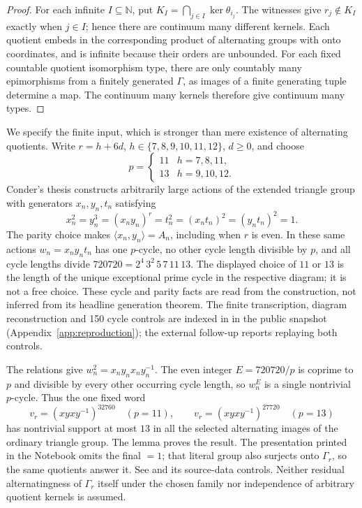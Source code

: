 \begin{proof}
For each infinite \(I\subseteq\mathbb N\), put
\(K_I=\bigcap_{j\in I}\ker\theta_{i_j}\).
The witnesses give \(r_j\notin K_I\) exactly when \(j\in I\);
hence there are continuum many different kernels.
Each quotient embeds in the corresponding product of alternating
groups with onto coordinates, and is infinite because their orders
are unbounded. For each fixed countable quotient isomorphism type,
there are only countably many epimorphisms from a finitely generated
\(\Gamma\), as images of a finite generating tuple determine a map.
The continuum many kernels therefore give continuum many types.
\end{proof}

We specify the finite input, which is stronger than mere existence
of alternating quotients.
Write \(r=h+6d\), \(h\in\{7,8,9,10,11,12\}\), \(d\ge0\), and choose
\[
 p=\begin{cases}11&h=7,8,11,\\13&h=9,10,12.\end{cases}
\]
Conder's thesis \cite[Chapter~5, pp.~117--120]{conder-thesis}
constructs arbitrarily large actions of the extended triangle group
with generators \(x_n,y_n,t_n\) satisfying
\[
 x_n^2=y_n^3=(x_ny_n)^r=t_n^2=(x_nt_n)^2=(y_nt_n)^2=1.
\]
The parity choice makes \(\langle x_n,y_n\rangle=A_n\), including
when \(r\) is even. In these same actions \(w_n=x_ny_nt_n\) has
one \(p\)-cycle, no other cycle length divisible by \(p\), and all
cycle lengths divide \(720720=2^4\,3^2\,5\,7\,11\,13\).
The displayed choice of \(11\) or \(13\) is the length of the unique
exceptional prime cycle in the respective diagram; it is not a free
choice. These cycle and parity facts are read from the construction,
not inferred from its headline generation theorem.
The finite transcription, diagram reconstruction and 150 cycle controls
are indexed in  in the public
snapshot (Appendix~\ref{app:reproduction}); the external follow-up
reports replaying both controls.

The relations give \(w_n^2=x_ny_nx_ny_n^{-1}\).
The even integer \(E=720720/p\) is coprime to \(p\) and divisible
by every other occurring cycle length, so \(w_n^E\) is a single
nontrivial \(p\)-cycle. Thus the one fixed word
\[
 v_r=(xyxy^{-1})^{32760}\quad(p=11),\qquad
 v_r=(xyxy^{-1})^{27720}\quad(p=13)
\]
has nontrivial support at most \(13\) in all the selected alternating
images of the ordinary triangle group.
The lemma proves the result.
The presentation printed in the Notebook omits the final \(=1\);
that literal group also surjects onto \(\Gamma_r\), so the same
quotients answer it.
See  and its source-data controls.
Neither residual alternatingness of \(\Gamma_r\) itself under the
chosen family nor independence of arbitrary quotient kernels is assumed.
